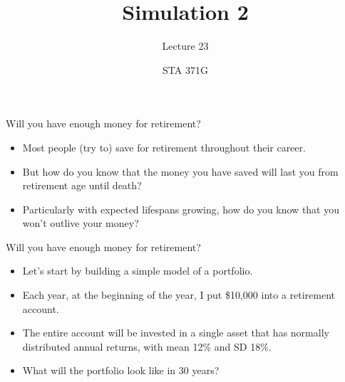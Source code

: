 \documentclass{beamer}\usepackage[]{graphicx}\usepackage[]{color}
\title{Simulation 2}
\subtitle{Lecture 23}
\author{STA 371G}
\begin{document}
  
  

  \frame{\maketitle}



  \begin{darkframes}
    \begin{frame}{Will you have enough money for retirement?}
      \begin{itemize}[<+->]
        \item Most people (try to) save for retirement throughout their career.
        \item But how do you know that the money you have saved will last you from retirement age until death?
        \item Particularly with expected lifespans growing, how do you know that you won't outlive your money?
      \end{itemize}
    \end{frame}

    \begin{frame}{Will you have enough money for retirement?}
      \begin{itemize}[<+->]
        \item Let's start by building a simple model of a portfolio.
        \item Each year, at the beginning of the year, I put \$10,000 into a retirement account.
        \item The entire account will be invested in a single asset that has normally distributed annual returns, with mean 12\% and SD 18\%.
        \item What will the portfolio look like in 30 years?
      \end{itemize}
    \end{frame}


\end{darkframes}
\end{document}
